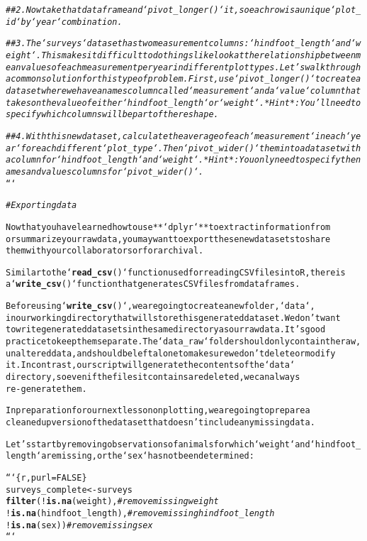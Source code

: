 \documentclass{article}\usepackage[]{graphicx}\usepackage[]{xcolor}
\makeatletter
\newcommand{\hlcom}[1]{\textcolor[rgb]{0.678,0.584,0.686}{\textit{#1}}}%
\newcommand{\hlkwd}[1]{\textcolor[rgb]{0.737,0.353,0.396}{\textbf{#1}}}%
\newenvironment{kframe}{%
 \def\at@end@of@kframe{}%
 \ifinner\ifhmode%
  \def\at@end@of@kframe{\end{minipage}}%
  \begin{minipage}{\columnwidth}%
 \fi\fi%
 \def\FrameCommand##1{\hskip\@totalleftmargin \hskip-\fboxsep
 \colorbox{shadecolor}{##1}\hskip-\fboxsep
     \hskip-\linewidth \hskip-\@totalleftmargin \hskip\columnwidth}%
 \MakeFramed {\advance\hsize-\width
   \@totalleftmargin\z@ \linewidth\hsize
   \@setminipage}}%
 {\par\unskip\endMakeFramed%
 \at@end@of@kframe}
\newenvironment{knitrout}{}{} %
\makeatother
\begin{document}
\begin{knitrout}
\begin{kframe}
\begin{alltt}
\hlcom{## 2. Now take that data frame and `pivot_longer()` it, so each row is a unique `plot_id` by `year` combination.}

\hlcom{## 3. The `surveys` data set has two measurement columns: `hindfoot_length` and `weight`. This makes it difficult to do things like look at the relationship between mean values of each measurement per year in different plot types. Let's walk through a common solution for this type of problem. First, use `pivot_longer()` to create a dataset where we have a names column called `measurement` and a `value` column that takes on the value of either `hindfoot_length` or `weight`. *Hint*: You'll need to specify which columns will be part of the reshape.}

\hlcom{## 4. With this new data set, calculate the average of each `measurement` in each `year` for each different `plot_type`. Then `pivot_wider()` them into a data set with a column for `hindfoot_length` and `weight`. *Hint*: You only need to specify the names and values columns for `pivot_wider()`.}
```

\hlcom{# Exporting data}

Now that you have learned how to use **`dplyr`** to extract information from
or summarize your raw data, you may want to export these new data sets to share
them with your collaborators or for archival.

Similar to the `\hlkwd{read_csv}()` function used for reading CSV files into R, there is
a `\hlkwd{write_csv}()` function that generates CSV files from data frames.

Before using `\hlkwd{write_csv}()`, we are going to create a new folder, `data`,
in our working directory that will store this generated dataset. We don't want
to write generated datasets in the same directory as our raw data. It's good
practice to keep them separate. The `data_raw` folder should only contain the raw,
unaltered data, and should be left alone to make sure we don't delete or modify
it. In contrast, our script will generate the contents of the `data`
directory, so even if the files it contains are deleted, we can always
re-generate them.

In preparation for our next lesson on plotting, we are going to prepare a
cleaned up version of the data set that doesn't include any missing data.

Let's start by removing observations of animals for which `weight` and `hindfoot_length` are missing, or the `sex` has not been determined:


```\{r, purl=FALSE\}
surveys_complete <- surveys %>%
  \hlkwd{filter}(!\hlkwd{is.na}(weight),           \hlcom{# remove missing weight}
         !\hlkwd{is.na}(hindfoot_length),  \hlcom{# remove missing hindfoot_length}
         !\hlkwd{is.na}(sex))                \hlcom{# remove missing sex}
```


\end{alltt}
\end{kframe}
\end{knitrout}
\end{document}
